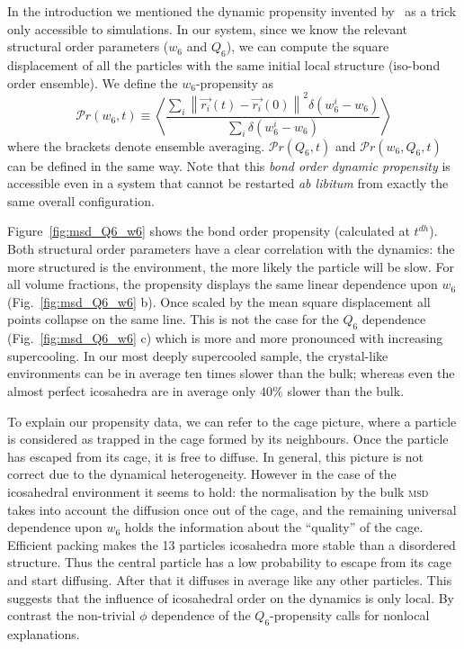 In the introduction we mentioned the dynamic propensity invented by~\citet{Widmer-Cooper2005} as a trick only accessible to simulations. In our system, since we know the relevant structural order parameters ($w_6$ and $Q_6$), we can compute the square displacement of all the particles with the same initial local structure (iso-bond order ensemble). We define the $w_6$-propensity as
\begin{equation}
	\mathcal{P}r(w_6, t) \equiv \left\langle \frac{
		\sum\limits_i{
			\left\|\vec{r_i}(t)-\vec{r_i}(0)\right\|^2 \delta(w_6^i-w_6)
			}
	}{
		\sum\limits_i{\delta(w_6^i-w_6)}
	}\right\rangle 
	\label{eq:bo_propensity}
\end{equation}
where the brackets denote ensemble averaging. $\mathcal{P}r(Q_6, t)$ and $\mathcal{P}r(w_6, Q_6, t)$ can be defined in the same way. Note that this \emph{bond order dynamic propensity} is accessible even in a system that cannot be restarted \emph{ab libitum} from exactly the same overall configuration.

Figure~\ref{fig:msd_Q6_w6} shows the bond order propensity (calculated at $t^{dh}$). Both structural order parameters have a clear correlation with the dynamics: the more structured is the environment, the more likely the particle will be slow. For all volume fractions, the propensity displays the same linear dependence upon $w_6$ (Fig.~\ref{fig:msd_Q6_w6} b). Once scaled by the mean square displacement all points collapse on the same line. This is not the case for the $Q_6$ dependence (Fig.~\ref{fig:msd_Q6_w6} c) which is more and more pronounced with increasing supercooling. In our most deeply supercooled sample, the crystal-like environments can be in average ten times slower than the bulk; whereas even the almost perfect icosahedra are in average only $40\%$ slower than the bulk.

To explain our propensity data, we can refer to the cage picture, where a particle is considered as trapped in the cage formed by its neighbours. Once the particle has escaped from its cage, it is free to diffuse. In general, this picture is not correct due to the dynamical heterogeneity. However in the case of the icosahedral environment it seems to hold: the normalisation by the bulk \textsc{msd} takes into account the diffusion once out of the cage, and the remaining universal dependence upon $w_6$ holds the information about the ``quality'' of the cage. Efficient packing makes the 13 particles icosahedra more stable than a disordered structure. Thus the central particle has a low probability to escape from its cage and start diffusing. After that it diffuses in average like any other particles. This suggests that the influence of icosahedral order on the dynamics is only local. By contrast the non-trivial $\phi$ dependence of the $Q_6$-propensity calls for nonlocal explanations.

